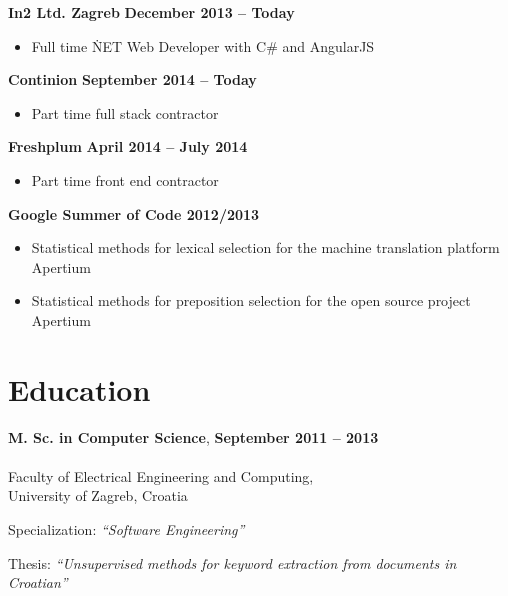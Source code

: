 \documentclass[margin,line]{resume}
\begin{document}
\begin{resume}
    \textbf{In2 Ltd. Zagreb} \vspace{1mm} \hfill \textbf{ December 2013 -- Today }
    \begin{itemize}
      \item Full time \.NET Web Developer with C\# and AngularJS
            \vspace{-1mm}
    \end{itemize}

    \textbf{Continion} \vspace{1mm} \hfill \textbf{ September 2014 -- Today }
    \begin{itemize}
      \item Part time full stack contractor
            \vspace{-1mm}
    \end{itemize}

    \textbf{Freshplum} \vspace{1mm} \hfill \textbf{ April 2014 -- July 2014 }
    \begin{itemize}
      \item Part time front end contractor
            \vspace{-1mm}
    \end{itemize}

    \textbf{Google Summer of Code 2012/2013 } \vspace{1mm}
    \begin{itemize}
      \item Statistical methods for lexical selection for the machine translation platform Apertium
            \vspace{-1mm}
      \item Statistical methods for preposition selection for the open source project Apertium \vspace{-1mm}
    \end{itemize}


    \section{\mysidestyle Education}

    \textbf{M. Sc. in Computer Science}, \hfill \textbf{ September 2011 -- 2013 }\vspace{-3mm}\\\vspace{-1mm}%
    \\Faculty of Electrical Engineering and Computing,\\
    University of Zagreb, Croatia \vspace{1mm}%
    \textsl{} 
    \begin{list2}
        \item Specialization: \textsl{``Software Engineering''} 
        \item Thesis: \textsl{``Unsupervised methods for keyword extraction from documents in Croatian''} 
    \end{list2}


\end{resume}
\end{document}
